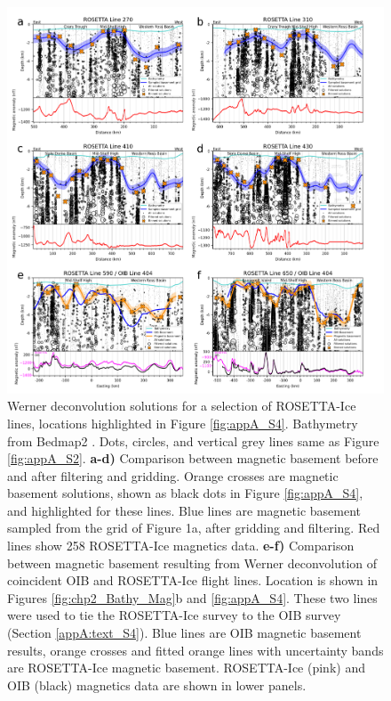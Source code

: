 \begin{figure}[!ht]
    \centering
    \includegraphics[width=.95\textwidth]{figures/chp2/figure_S3.png}
    \caption[Werner deconvolution solutions for ROSETTA-Ice lines]{Werner deconvolution solutions for a selection of ROSETTA-Ice lines, locations highlighted in Figure \ref{fig:appA_S4}. Bathymetry from Bedmap2 \citep{fretwellbedmap22013}. Dots, circles, and vertical grey lines same as Figure \ref{fig:appA_S2}. \textbf{a-d)} Comparison between magnetic basement before and after filtering and gridding. Orange crosses are magnetic basement solutions, shown as black dots in Figure \ref{fig:appA_S4}, and highlighted for these lines. Blue lines are magnetic basement sampled from the grid of Figure 1a, after gridding and filtering. Red lines show 258 ROSETTA-Ice magnetics data. \textbf{e-f)} Comparison between magnetic basement resulting from Werner deconvolution of coincident OIB and ROSETTA-Ice flight lines. Location is shown in Figures \ref{fig:chp2_Bathy_Mag}b and \ref{fig:appA_S4}. These two lines were used to tie the ROSETTA-Ice survey to the OIB survey (Section \ref{appA:text_S4}). Blue lines are OIB magnetic basement results, orange crosses and fitted orange lines with uncertainty bands are ROSETTA-Ice magnetic basement. ROSETTA-Ice (pink) and OIB (black) magnetics data are shown in lower panels.}
    \label{fig:appA_S3} 
\end{figure}


